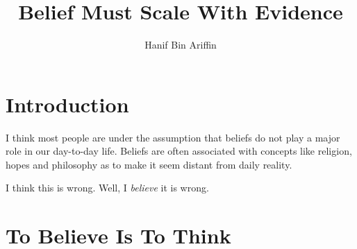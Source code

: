 \documentclass[a4paper,10pt]{book}
\title{Belief Must Scale With Evidence}
\author{Hanif Bin Ariffin}
\begin{document}
\maketitle
\tableofcontents

\newpage
\section{Introduction}

I think most people are under the assumption that beliefs do not play a major role in our day-to-day life.
Beliefs are often associated with concepts like religion, hopes and philosophy as to make it seem distant from daily reality.

I think this is wrong.
Well, I \textit{believe} it is wrong.

\newpage
\section{To Believe Is To Think}
\end{document}
